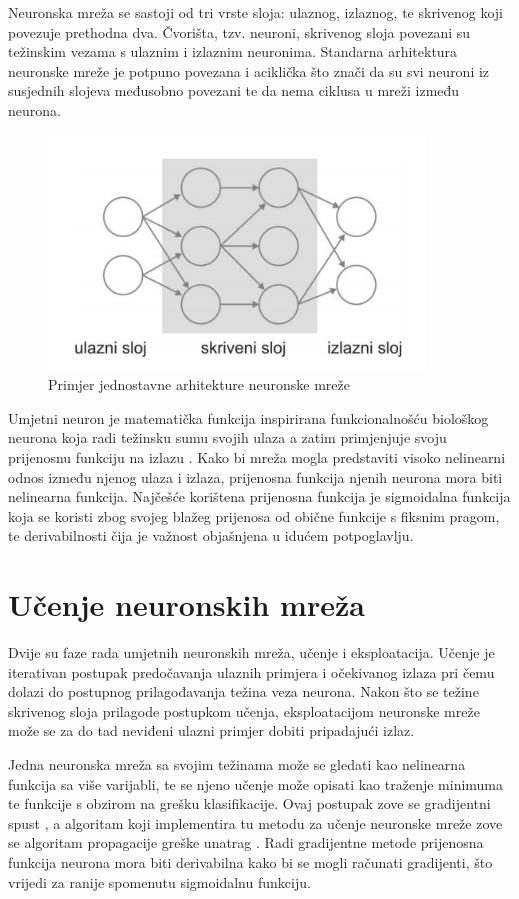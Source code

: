 \documentclass[lmodern, utf8, diplomski, numeric]{fer}
\begin{document}
Neuronska mreža se sastoji od tri vrste sloja: ulaznog, izlaznog, te skrivenog koji povezuje prethodna dva. Čvorišta, tzv. neuroni, skrivenog sloja povezani su težinskim vezama s ulaznim i izlaznim neuronima. Standarna arhitektura neuronske mreže je potpuno povezana i aciklička što znači da su svi neuroni iz susjednih slojeva međusobno povezani te da nema ciklusa u mreži između neurona. 

\begin{figure}[ht!]
\centering
\includegraphics[width=10cm]{slike/neural_architecture.png}
\caption{Primjer jednostavne arhitekture neuronske mreže}
\end{figure}

Umjetni neuron je matematička funkcija inspirirana funkcionalnošću biološkog neurona koja radi težinsku sumu svojih ulaza a zatim primjenjuje svoju prijenosnu funkciju na izlazu \cite{neuron1943pitts}. Kako bi mreža mogla predstaviti visoko nelinearni odnos između njenog ulaza i izlaza, prijenosna funkcija njenih neurona mora biti nelinearna funkcija. Najčešće korištena prijenosna funkcija je sigmoidalna funkcija koja se koristi zbog svojeg blažeg prijenosa od obične funkcije s fiksnim pragom, te derivabilnosti čija je važnost objašnjena u idućem potpoglavlju.

\section{Učenje neuronskih mreža}

Dvije su faze rada umjetnih neuronskih mreža, učenje i eksploatacija. Učenje je iterativan postupak predočavanja ulaznih primjera i očekivanog izlaza pri čemu dolazi do postupnog prilagođavanja težina veza neurona. Nakon što se težine skrivenog sloja prilagode postupkom učenja, eksploatacijom neuronske mreže može se za do tad neviđeni ulazni primjer dobiti pripadajući izlaz.

Jedna neuronska mreža sa svojim težinama može se gledati kao nelinearna funkcija sa više varijabli, te se njeno učenje može opisati kao traženje minimuma te funkcije s obzirom na grešku klasifikacije. Ovaj postupak zove se gradijentni spust , a algoritam koji implementira tu metodu za učenje neuronske mreže zove se algoritam propagacije greške unatrag  \cite{backProp}. Radi gradijentne metode prijenosna funkcija neurona mora biti derivabilna kako bi se mogli računati gradijenti, što vrijedi za ranije spomenutu sigmoidalnu funkciju.
\end{document}

